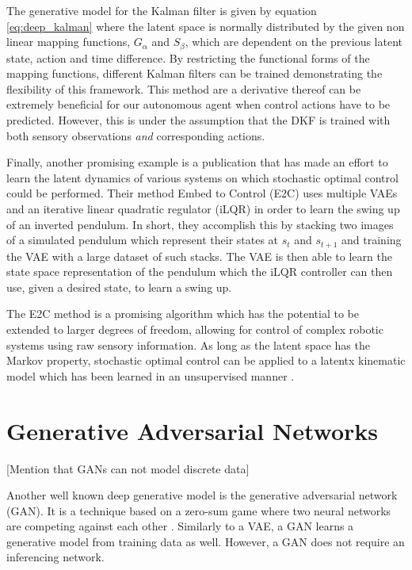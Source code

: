 \documentclass[main.tex]{subfiles}
\begin{document}
The generative model for the Kalman filter is given by equation \eqref{eq:deep_kalman} where the latent space is normally distributed by the given non linear mapping functions, $G_\alpha$ and $S_\beta$, which are dependent on the previous latent state, action and time difference. By restricting the functional forms of the mapping functions, different Kalman filters can be trained demonstrating the flexibility of this framework. This method are a derivative thereof can be extremely beneficial for our autonomous agent when control actions have to be predicted. However, this is under the assumption that the DKF is trained with both sensory observations \textit{and} corresponding actions.

Finally, another promising example is a publication that has made an effort to learn the latent dynamics of various systems on which stochastic optimal control \cite{watter2015embed} could be performed. Their method Embed to Control (E2C) uses multiple VAEs and an iterative linear quadratic regulator (iLQR) in order to learn the swing up of an inverted pendulum. In short, they accomplish this by stacking two images of a simulated pendulum which represent their states at $s_t$ and $s_{t+1}$ and training the VAE with a large dataset of such stacks. The VAE is then able to learn the state space representation of the pendulum which the iLQR controller can then use, given a desired state, to learn a swing up. 

The E2C method is a promising algorithm which has the potential to be extended to larger degrees of freedom, allowing for control of complex robotic systems using raw sensory information. As long as the latent space has the Markov property, stochastic optimal control can be applied to a latentx kinematic model which has been learned in an unsupervised manner \cite{matsubara2014latent}. 

\section{Generative Adversarial Networks}
[Mention that GANs can not model discrete data]

Another well known deep generative model is the generative adversarial network (GAN). It is a technique based on a zero-sum game where two neural networks are competing against each other \cite{goodfellow2014generative}. Similarly to a VAE, a GAN learns a generative model from training data as well. However, a GAN does not require an inferencing network.
\end{document}
